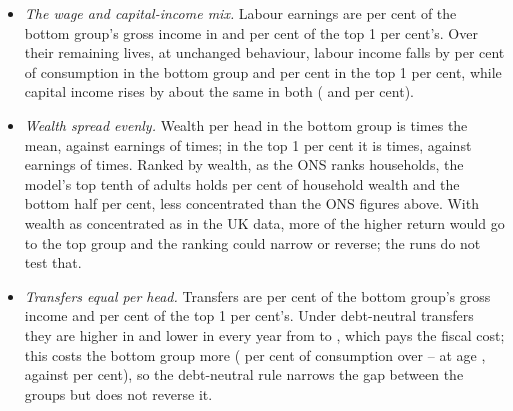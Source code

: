 \begin{itemize}
\item \emph{The wage and capital-income mix.} Labour earnings are \genCohLabourIncShareBottomCentral{} per cent of the bottom group's gross income in \genShockYear{} and \genCohLabourIncShareTopOneCentral{} per cent of the top 1 per cent's. Over their remaining lives, at unchanged behaviour, labour income falls by \genCohMainDnCentralSrcLabBottomAbs{} per cent of consumption in the bottom group and \genCohMainDnCentralSrcLabTopOneAbs{} per cent in the top 1 per cent, while capital income rises by about the same in both (\genCohMainDnCentralSrcCapBottomAbs{} and \genCohMainDnCentralSrcCapTopOneAbs{} per cent).
\item \emph{Wealth spread evenly.} Wealth per head in the bottom group is \genCohWealthRelBottomCentral{} times the mean, against earnings of \genCohEarnRelBottomCentral{} times; in the top 1 per cent it is \genCohWealthRelTopOneCentral{} times, against earnings of \genCohEarnRelTopOneCentral{} times. Ranked by wealth, as the ONS ranks households, the model's top tenth of adults holds \genCohWealthTopTenthCentral{} per cent of household wealth and the bottom half \genCohWealthBottomHalfCentral{} per cent, less concentrated than the ONS figures above. With wealth as concentrated as in the UK data, more of the higher return would go to the top group and the ranking could narrow or reverse; the runs do not test that.
\item \emph{Transfers equal per head.} Transfers are \genCohTransferIncShareBottomCentral{} per cent of the bottom group's gross income and \genCohTransferIncShareTopOneCentral{} per cent of the top 1 per cent's. Under debt-neutral transfers they are higher in \genShockYear{} and lower in every year from \genYearAfterShock{} to \genLastFlowYear{}, which pays the fiscal cost; this costs the bottom group more (\genCohMainDnCentralIncTrBottomAbs{} per cent of consumption over \genShockYear--\genLastFlowYear{} at age \genCohIncomeAge{}, against \genCohMainDnCentralIncTrTopOneAbs{} per cent), so the debt-neutral rule narrows the gap between the groups but does not reverse it.
\end{itemize}

